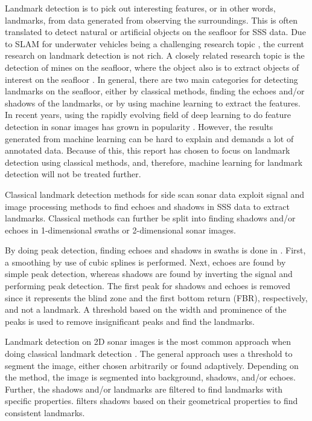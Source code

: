 Landmark detection is to pick out interesting features, or in other words, landmarks, from data generated from observing the surroundings. This is often translated to detect natural or artificial objects on the seafloor for SSS data. Due to SLAM for underwater vehicles being a challenging research topic \cite{Hidalgo2015ReviewTechniques}, the current research on landmark detection is not rich. A closely related research topic is the detection of mines on the seafloor, where the object also is to extract objects of interest on the seafloor \cite{Picard2016DetectionDimensionality}. In general, there are two main categories for detecting landmarks on the seafloor, either by classical methods, finding the echoes and/or shadows of the landmarks, or by using machine learning to extract the features. In recent years, using the rapidly evolving field of deep learning to do feature detection in sonar images has grown in popularity \cite{Wang2020ImageSonar} \cite{Zhou2022NonlinearFeatures}. However, the results generated from machine learning can be hard to explain and demands a lot of annotated data. Because of this, this report has chosen to focus on landmark detection using classical methods, and, therefore, machine learning for landmark detection will not be treated further.

Classical landmark detection methods for side scan sonar data exploit signal and image processing methods to find echoes and shadows in SSS data to extract landmarks. Classical methods can further be split into finding shadows and/or echoes in 1-dimensional swaths or 2-dimensional sonar images.

By doing peak detection, finding echoes and shadows in swaths is done in \cite{Al-Rawi2017LandmarkImages}. First, a smoothing by use of cubic splines is performed. Next, echoes are found by simple peak detection, whereas shadows are found by inverting the signal and performing peak detection. The first peak for shadows and echoes is removed since it represents the blind zone and the first bottom return (FBR), respectively, and not a landmark. A threshold based on the width and prominence of the peaks is used to remove insignificant peaks and find the landmarks.  

Landmark detection on 2D sonar images is the most common approach when doing classical landmark detection \cite{Wang2017UnderwaterSonar} \cite{Siantidis2016SideVehicles} \cite{Yuan2016AnNavigation} \cite{Leblond2019SonarProject}. The general approach uses a threshold to segment the image, either chosen arbitrarily or found adaptively. Depending on the method, the image is segmented into background, shadows, and/or echoes. Further, the shadows and/or landmarks are filtered to find landmarks with specific properties. \cite{Leblond2019SonarProject} filters shadows based on their geometrical properties to find consistent landmarks. 

